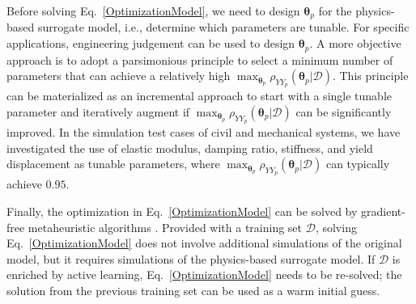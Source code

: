 \documentclass[number,preprint,3p]{elsarticle}
\newcommand{\1}[2]{\mathbb{I}_{#1}\left(#2\right)}
\newcommand{\vect}[1]{\boldsymbol{#1}}
\begin{document}
	
 
 Before solving Eq.~\eqref{OptimizationModel}, we need to design $\vect\theta_p$ for the physics-based surrogate model, i.e., determine which parameters are tunable. For specific applications,  engineering judgement can be used to design $\vect\theta_p$. A more objective approach is to adopt a parsimonious principle to select a minimum number of parameters that can achieve a relatively high $\max_{\vect\theta_p}\rho_{YY_p}(\vect{\theta}_{p}|\mathcal{D})$. This principle can be materialized as an incremental approach to start with a single tunable parameter and iteratively augment if $\max_{\vect\theta_p}\rho_{YY_p}(\vect{\theta}_{p}|\mathcal{D})$ can be significantly improved. In the simulation test cases of civil and mechanical systems, we have investigated the use of elastic modulus, damping ratio, stiffness, and yield displacement as tunable parameters, where $\max_{\vect\theta_p}\rho_{YY_p}(\vect{\theta}_{p}|\mathcal{D})$ can typically achieve $0.95$. 

 	Finally, the optimization in Eq.~\eqref{OptimizationModel} can be solved by gradient-free metaheuristic algorithms \cite{conn2009introduction}. Provided with a training set $\mathcal{D}$, solving Eq.~\eqref{OptimizationModel} does not involve additional simulations of the original model, but it requires simulations of the physics-based surrogate model. If $\mathcal{D}$ is enriched by active learning, Eq.~\eqref{OptimizationModel} needs to be re-solved; the solution from the previous training set can be used as a warm initial guess.
\end{document}
